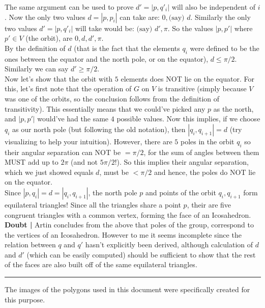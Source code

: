 \begin{aenumerate}
The same argument can be used to prove $d' = |p,q'_{i}|$ will also be independent of $i$. Now the only two values $d=|p,p_{i}|$ can take are: $0, \text {(say) }d$. Similarly the only two values $d'=|p,q'_{i}|$ will take would be: $\text{(say) } d', \pi$. So the values $|p,p'|$ where $p' \in V$ (the orbit), are $0,d,d',\pi$.\\
By the definition of $d$ (that is the fact that the elements $q_{i}$ were defined to be the ones between the equator and the north pole, or on the equator), $d\leq \pi/2$. Similarly we can say $d'\geq \pi/2$.\\
Now let's show that the orbit with $5$ elements does NOT lie on the equator. For this, let's first note that the operation of $G$ on $V$ is transitive (simply because $V$ was one of the orbits, so the conclusion follows from the definition of transitivity). This essentially means that we could've picked any $p$ as the north, and $|p,p'|$ would've had the same $4$ possible values. Now this implies, if we choose $q_{i}$ as our north pole (but following the old notation), then $|q_{i},q_{i+1}| = d$ (try visualizing to help your intuition). However, there are $5$ poles in the orbit $q_{i}$ so their angular separation can NOT be $=\pi/2$, for the sum of angles between them MUST add up to $2\pi$ (and not $5\pi/2$!). So this implies their angular separation, which we just showed equals $d$, must be $<\pi/2$ and hence, the poles do NOT lie on the equator.\\
Since $|p,q_{i}|=d=|q_{i},q_{i+1}|$, the north pole $p$ and points of the orbit $q_{i},q_{i+1}$ form equilateral triangles! Since all the triangles share a point $p$, their are five congruent triangles with a common vertex, forming the face of an Icosahedron.\\
{\bf Doubt | } Artin concludes from the above that poles of the group, correspond to the vertices of an Icosahedron. However to me it seems incomplete since the relation between ${q}$ and ${q'}$ hasn't explicitly been derived, although calculation of $d$ and $d'$ (which can be easily computed) should be sufficient to show that the rest of the faces are also built off of the same equilateral triangles.
\end{aenumerate}
\vspace{330pt}
\hrule
The images of the polygons used in this document were specifically created for this purpose.
